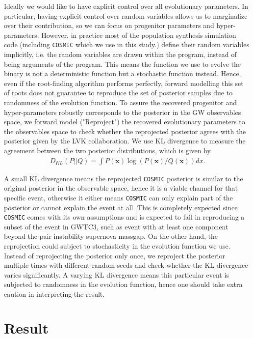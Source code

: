 \documentclass[twocolumn]{aastex631}
\begin{document}
Ideally we would like to have explicit control over all evolutionary parameters.
In particular, having explicit control over random variables allows us to marginalize over their contribution, so we can focus on progenitor parameters and hyper-parameters.
However, in practice most of the population synthesis simulation code (including \texttt{COSMIC} which we use in this study.) define their random variables implicitly,
i.e. the random variables are drawn within the program, instead of being arguments of the program.
This means the function we use to evolve the binary is not a deterministic function but a stochastic function instead. 
Hence, even if the root-finding algorithm performs perfectly,
forward modelling this set of roots does not guarantee to reproduce the set of posterior samples due to randomness of the evolution function.
To assure the recovered progenitor and hyper-parameters robustly corresponds to the posterior in the GW observables space,
we forward model ("Reproject") the recovered evolutionary parameters to the observables space to check whether the reprojected posterior agrees with the posterior given by the LVK collaboration.
We use KL divergence to measure the agreement between the two posterior distributions, which is given by
\begin{align}
D_{KL}(P||Q) = \int P(\bm{x}) \log(P(\bm{x})/Q(\bm{x})) dx.
\label{eq:KLdivergence}
\end{align}

A small KL divergence means the reprojected \texttt{COSMIC} posterior is similar to the original posterior in the observable space, hence it is a viable channel for that specific event, otherwise it either means \texttt{COSMIC} can only explain part of the posterior or cannot explain the event at all.
This is completely expected since \texttt{COSMIC} comes with its own assumptions and is expected to fail in reproducing a subset of the event in GWTC3, such as event with at least one component beyond the pair instability supernova massgap.
On the other hand, the reprojection could subject to stochasticity in the evolution function we use.
Instead of reprojecting the posterior only once, we reproject the posterior multiple times with different random seeds and check whether the KL divergence varies significantly.
A varying KL divergence means this particular event is subjected to randomness in the evolution function, hence one should take extra caution in interpreting the result.


\section{Result}
\label{sec:result}
\end{document}
